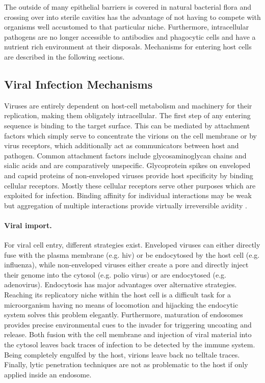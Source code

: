 The outside of many epithelial barriers is covered in natural bacterial flora and crossing over into sterile cavities has the advantage of not having to compete with organisms well accustomed to that particular niche. Furthermore, intracellular pathogens are no longer accessible to antibodies and phagocytic cells and have a nutrient rich environment at their disposals. Mechanisms for entering host cells are described in the following sections.

\subsection{Viral Infection Mechanisms}

Viruses are entirely dependent on host-cell metabolism and machinery for their replication, making them obligately intracellular. The first step of any entering sequence is binding to the target surface. This can be mediated by attachment factors which simply serve to concentrate the virions on the cell membrane or by virus receptors, which additionally act as communicators between host and pathogen. Common attachment factors include glycosaminoglycan chains and sialic acids and are comparatively unspecific. Glycoprotein spikes on enveloped and capsid proteins of non-enveloped viruses provide host specificity by binding cellular receptors. Mostly these cellular receptors serve other purposes which are exploited for infection. Binding affinity for individual interactions may be weak but aggregation of multiple interactions provide virtually irreversible avidity \citep{Smith2012}.

\paragraph{Viral import.}
For viral cell entry, different strategies exist. Enveloped viruses can either directly fuse with the plasma membrane (e.g. \gls{hiv}) or be endocytosed by the host cell (e.g. influenza), while non-enveloped viruses either create a pore and directly inject their genome into the cytosol (e.g. polio virus) or are endocytosed (e.g. adenovirus). Endocytosis has major advantages over alternative strategies. Reaching its replicatory niche within the host cell is a difficult task for a microorganism having no means of locomotion and hijacking the endocytic system solves this problem elegantly. Furthermore, maturation of endosomes provides precise environmental cues to the invader for triggering uncoating and release. Both fusion with the cell membrane and injection of viral material into the cytosol leaves back traces of infection to be detected by the immune system. Being completely engulfed by the host, virions leave back no telltale traces. Finally, lytic penetration techniques are not as problematic to the host if only applied inside an endosome.


